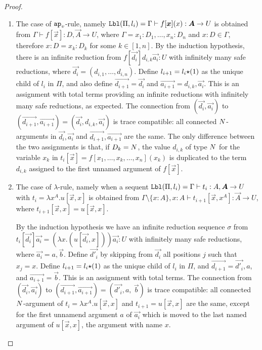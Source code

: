 \begin{proof}
\begin{enumerate}
\item
  The case of $\apvar$-rule, namely 
  $\Label(\Pi,l_i) 
  = 
  \Gamma \vdash f[\vec{x}](x): \vec{A}\rightarrow U$ is obtained from
  $\Gamma \vdash f[\vec{x}]: D,\vec{A} \rightarrow U$,
  where $\Gamma=x_1:D_1,\ldots,x_n:D_n$ and $x:D\in\Gamma$, therefore
  $x:D = x_k:D_k$ for some $k \in [1,n]$. 
  By the induction hypothesis, 
  there is an infinite reduction from $f[\vec{d_i}]d_{i,k}\vec{a_i}: U$
  with infinitely many safe reductions,
  where $\vec{d_i} = (d_{i,1},\ldots,d_{i,n})$. 
  Define $l_{i+1}=l_i{\star}(1)$ as the unique child of $l_i$ in $\Pi$, and
  also define $\vec{d_{i+1}} = \vec{d_i}$ and $\vec{a_{i+1}} = d_{i,k},\vec{a_i}$. 
  This is an assignment with total terms providing an infinite reductions with 
  infinitely many safe reductions, as expected.
  The connection from
  $(\vec{d_i},\vec{a_i})$ to
  $(\vec{d_{i+1}},\vec{a_{i+1}}) = (\vec{d_i},d_{i,k},\vec{a_i})$
  is trace compatible: all connected ${N}$-arguments in $\vec{d_i},\vec{a_i}$ and 
  $\vec{d_{i+1}},\vec{a_{i+1}}$ are the same.  
  The only difference between the two assignments
  is that, if $D_k = {N}$, the value $d_{i,k}$ of type ${N}$ for the variable $x_k$
  in $t_i[\vec{x}]=f[x_1,\ldots,x_k,\ldots,x_n](x_k)$ is duplicated to the term $d_{i,k}$ 
  assigned to the first unnamed argument of $ f[\vec{x}]$. 


\item
  The case of $\lambda$-rule, namely when a sequent
  $
    \Label(\Pi,l_i) 
    = 
    \Gamma\vdash t_i : A, \vec{A} \rightarrow U
  $ 
  with 
  $
    t_i 
    = 
    \lambda x^A.u[\vec{x},x]
  $
  is obtained from
  $
  \Gamma\setminus\{x:A\},x:A
  \vdash 
  t_{i+1}[\vec{x},x^A]:\vec{A}\rightarrow U
  $, 
  where $t_{i+1}[\vec{x},x]=u[\vec{x},x]$.
  
  By the induction hypothesis we have an infinite reduction sequence $\sigma$ from
  $t_i[\vec{d_i}]\vec{a_i} = (\lambda x.(u[\vec{d_i},x]))\vec{a_i}: U$ 
  with infinitely many safe reductions, where $\vec{a_i} = a,\vec{b}$. 
  Define $\vec{d'_i}$ by skipping from $\vec{d_i}$ all positions $j$ such that $x_j = x$.
  Define $l_{i+1}=l_i{\star}(1)$ as the unique child of $l_i$ in $\Pi$,
  and $\vec{d_{i+1}} = \vec{d'_i},a$, and $\vec{a_{i+1}} = \vec{b}$. 
  This is an assignment with total terms. The connection from 
  $(\vec{d_i},\vec{a_i})$ to $(\vec{d_{i+1}},\vec{a_{i+1}}) = (\vec{d'_i},a, \ \vec{b})$ is
  trace compatible: all connected ${N}$-argument of 
  $t_{i}=\lambda x^A.u[\vec{x},x]$ and $t_{i+1}=u[\vec{x},x]$ are 
  the same, except for the first unnamend argument $a$ of $\vec{a_i}$ which is moved to
  the last named argument of $u[\vec{x},x]$, the argument with name $x$.
 

\end{enumerate}
\end{proof}
